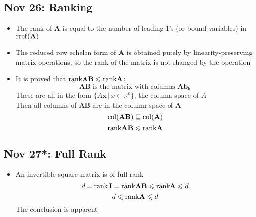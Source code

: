 \documentclass[10pt, oneside]{article}
\let\subspeq\sqsubseteq
\let\leq\leqslant
\newcommand{\R}{\mathbb{R}}
\renewcommand{\vec}[1]{\mathbf{#1}}
\newcommand{\mat}[1]{\mathbf{#1}}
\begin{document}
\subsection{Nov 26: Ranking}
\begin{itemize}
    \item The rank of $\mat{A}$ is equal to the number of leading $1$'s (or bound variables) in ${\rm rref}(\mat{A})$
    \item The reduced row echelon form of $\mat{A}$ is obtained purely by linearity-preserving matrix operations, so the rank of the matrix is not changed by the operation
    \item It is proved that ${\rm rank} \mat{AB} \leq {\rm rank} \mat{A}$:
        \[\mat{AB} \text{ is the matrix with columns $\mat{A}\vec{b_k}$}\]
        These are all in the form $\{A\vec{x} \, | \, x \in \R^e\}$, the column space of $A$\\
        Then all columns of $\mat{AB}$ are in the column space of $\mat{A}$
            \[{\rm col}(\mat{AB}) \subspeq {\rm col}(\mat{A})\]
            \[{\rm rank} \mat{AB} \leq {\rm rank} \mat{A}\]
\end{itemize}

\subsection{Nov 27*: Full Rank}
\begin{itemize}
    \item An invertible square matrix is of full rank
        \[d = {\rm rank} \, \mat{I} = {\rm rank} \mat{AB} \leq {\rm rank} \mat{A} \leq d\]
        \[d\leq {\rm rank} \mat{A} \leq d\]
        The conclusion is apparent
\end{itemize}
\end{document}
